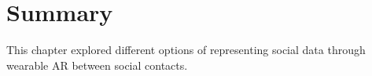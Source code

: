 \section{Summary}

This chapter explored different options of representing social data through wearable AR between social contacts. 

